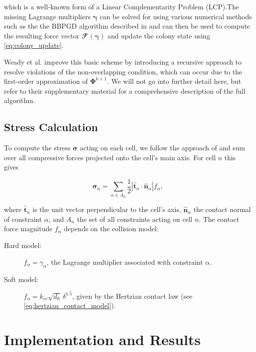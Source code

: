 \documentclass[conference]{IEEEtran}
\begin{document}
which is a well-known form of a Linear Complementarity Problem (LCP).The missing Lagrange multipliers $\boldsymbol{\gamma}$ can be solved for using various numerical methods such as the the BBPGD algorithm described in \cite{Weady2024} and can then be used to compute the resulting force vector $\mathbfcal{F}(\boldsymbol{\gamma})$ and update the colony state using \autoref{eq:colony_update}.

Weady et al. \cite{Weady2024} improve this basic scheme by introducing a recursive approach to resolve violations of the non-overlapping condition, which can occur due to the first-order approximation of $\mathbf{\Phi}^{k+1}$. We will not go into further detail here, but refer to their supplementary material for a comprehensive description of the full algorithm.

\subsection{Stress Calculation}
To compute the stress $\boldsymbol{\sigma}$ acting on each cell, we follow the approach of \cite{Weady2024} and sum over all compressive forces projected onto the cell’s main axis. For cell $n$ this gives

\begin{equation}
    \boldsymbol{\sigma}_n = \sum_{\alpha \in A_n}
    \frac{1}{2} \left |\hat{\mathbf{t}}_n \cdot \hat{\mathbf{n}}_\alpha \right | f_\alpha,
\end{equation}

where $\hat{\mathbf{t}}_n$ is the unit vector perpendicular to the cell’s axis, $\hat{\mathbf{n}}_\alpha$ the contact normal of constraint $\alpha$, and $A_n$ the set of all constraints acting on cell $n$. The contact force magnitude $f_\alpha$ depends on the collision model:

\begin{description}
    \item[Hard model:]  $f_\alpha = \gamma_\alpha$, the Lagrange multiplier associated with constraint $\alpha$.
    \item[Soft model:] $f_\alpha = k_{cc} \sqrt{d_0}\,\delta^{1.5}$, given by the Hertzian contact law (see \autoref{eq:hertzian_contact_model}).
\end{description}



\newpage

\section{Implementation and Results}
\end{document}
